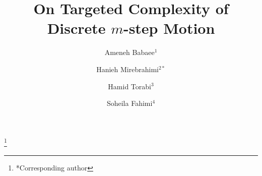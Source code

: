 \documentclass[preprint,11pt %
]{hjm1}
\theoremstyle{definition}
\begin{document}



\title{On Targeted Complexity of Discrete $m$-step Motion}


\author[A. Babaee]{Ameneh Babaee$^1$}
\author[H. Mirebrahimi]{Hanieh Mirebrahimi$^{2*}$}\thanks{*Corresponding author}
\author[H. Torabi]{Hamid Torabi$^3$}
\author[S. Fahimi]{Soheila Fahimi$^4$}
\address{$^{1,2,3,4}$ Department of Pure Mathematics, Faculty of Mathematical Sciences, Ferdowsi University of Mashhad, P. O. Box 1159, Mashhad 91775, Iran.}





\end{document}
